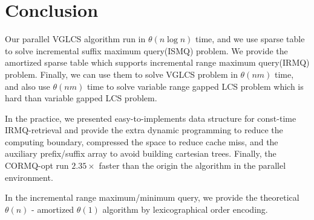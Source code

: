 \section{Conclusion}
\label{sec:Conclusion}

Our parallel VGLCS algorithm run in $\theta(n \log n)$ time, and we
use sparse table to solve incremental suffix maximum query(ISMQ)
problem.  We provide the amortized sparse table which supports
incremental range maximum query(IRMQ) problem.  Finally, we can use
them to solve VGLCS problem in $\theta(nm)$ time, and also use
$\theta(nm)$ time to solve variable range gapped LCS problem which is
hard than variable gapped LCS problem.

In the practice, we presented easy-to-implements data structure for
const-time IRMQ-retrieval and provide the extra dynamic programming to
reduce the computing boundary, compressed the space to reduce cache
miss, and the auxiliary prefix/suffix array to avoid building
cartesian trees. Finally, the CORMQ-opt run $2.35 \times$ faster than
the origin the algorithm in the parallel environment.

In the incremental range maximum/minimum query, we provide the
theoretical $\theta(n)$ - amortized $\theta(1)$ algorithm by
lexicographical order encoding.